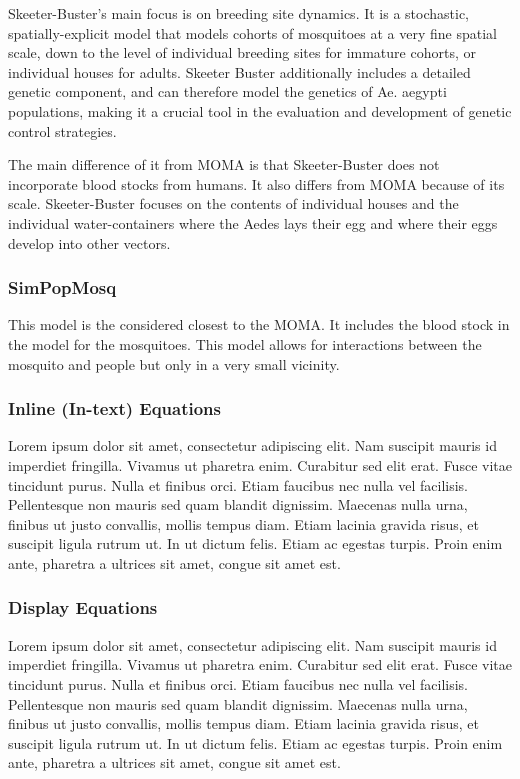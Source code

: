 Skeeter-Buster's main focus is on breeding site dynamics. It is a stochastic, spatially-explicit model that models cohorts of mosquitoes at a very fine spatial scale, down to the level of individual breeding sites for immature cohorts, or individual houses for adults. Skeeter Buster additionally includes a detailed genetic component, and can therefore model the genetics of Ae. aegypti populations, making it a crucial tool in the evaluation and development of genetic control strategies. 

The main difference of it from MOMA is that Skeeter-Buster does not incorporate blood stocks from humans. It also differs from MOMA because of its scale. Skeeter-Buster focuses on the contents of individual houses and the individual water-containers where the Aedes lays their egg and where their eggs develop into other vectors. 

\subsubsection{SimPopMosq}

This model is the considered closest to the MOMA. It includes the blood stock in the model for the mosquitoes. This model allows for interactions between the mosquito and people but only in a very small vicinity.

\subsubsection{Inline (In-text) Equations}
Lorem ipsum dolor sit amet, consectetur adipiscing elit. Nam suscipit mauris id imperdiet fringilla. Vivamus ut pharetra enim. Curabitur sed elit erat. Fusce vitae tincidunt purus. Nulla et finibus orci. Etiam faucibus nec nulla vel facilisis. Pellentesque non mauris sed quam blandit dignissim. Maecenas nulla urna, finibus ut justo convallis, mollis tempus diam. Etiam lacinia gravida risus, et suscipit ligula rutrum ut. In ut dictum felis. Etiam ac egestas turpis. Proin enim ante, pharetra a ultrices sit amet, congue sit amet est.

\subsubsection{Display Equations}
Lorem ipsum dolor sit amet, consectetur adipiscing elit. Nam suscipit mauris id imperdiet fringilla. Vivamus ut pharetra enim. Curabitur sed elit erat. Fusce vitae tincidunt purus. Nulla et finibus orci. Etiam faucibus nec nulla vel facilisis. Pellentesque non mauris sed quam blandit dignissim. Maecenas nulla urna, finibus ut justo convallis, mollis tempus diam. Etiam lacinia gravida risus, et suscipit ligula rutrum ut. In ut dictum felis. Etiam ac egestas turpis. Proin enim ante, pharetra a ultrices sit amet, congue sit amet est.


